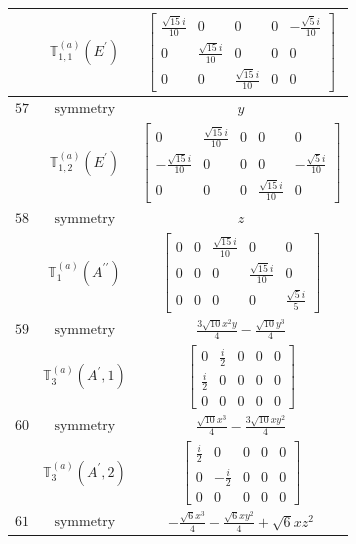 \documentclass[fleqn,8pt,landscape]{jsarticle}
\begin{document}
\begin{longtable}{ccc}
$  $ & $ \mathbb{T}_{1,1}^{(a)}(E^{\prime}) $ & $ \begin{bmatrix} \frac{\sqrt{15} i}{10} & 0 & 0 & 0 & - \frac{\sqrt{5} i}{10} \\ 0 & \frac{\sqrt{15} i}{10} & 0 & 0 & 0 \\ 0 & 0 & \frac{\sqrt{15} i}{10} & 0 & 0 \end{bmatrix} $ \\ \hline
$ 57 $ & $ \text{symmetry} $ & $ y $ \\
$  $ & $ \mathbb{T}_{1,2}^{(a)}(E^{\prime}) $ & $ \begin{bmatrix} 0 & \frac{\sqrt{15} i}{10} & 0 & 0 & 0 \\ - \frac{\sqrt{15} i}{10} & 0 & 0 & 0 & - \frac{\sqrt{5} i}{10} \\ 0 & 0 & 0 & \frac{\sqrt{15} i}{10} & 0 \end{bmatrix} $ \\ \hline
$ 58 $ & $ \text{symmetry} $ & $ z $ \\
$  $ & $ \mathbb{T}_{1}^{(a)}(A^{\prime\prime}) $ & $ \begin{bmatrix} 0 & 0 & \frac{\sqrt{15} i}{10} & 0 & 0 \\ 0 & 0 & 0 & \frac{\sqrt{15} i}{10} & 0 \\ 0 & 0 & 0 & 0 & \frac{\sqrt{5} i}{5} \end{bmatrix} $ \\ \hline
$ 59 $ & $ \text{symmetry} $ & $ \frac{3 \sqrt{10} x^{2} y}{4} - \frac{\sqrt{10} y^{3}}{4} $ \\
$  $ & $ \mathbb{T}_{3}^{(a)}(A^{\prime},1) $ & $ \begin{bmatrix} 0 & \frac{i}{2} & 0 & 0 & 0 \\ \frac{i}{2} & 0 & 0 & 0 & 0 \\ 0 & 0 & 0 & 0 & 0 \end{bmatrix} $ \\ \hline
$ 60 $ & $ \text{symmetry} $ & $ \frac{\sqrt{10} x^{3}}{4} - \frac{3 \sqrt{10} x y^{2}}{4} $ \\
$  $ & $ \mathbb{T}_{3}^{(a)}(A^{\prime},2) $ & $ \begin{bmatrix} \frac{i}{2} & 0 & 0 & 0 & 0 \\ 0 & - \frac{i}{2} & 0 & 0 & 0 \\ 0 & 0 & 0 & 0 & 0 \end{bmatrix} $ \\ \hline
$ 61 $ & $ \text{symmetry} $ & $ - \frac{\sqrt{6} x^{3}}{4} - \frac{\sqrt{6} x y^{2}}{4} + \sqrt{6} x z^{2} $ \\

\end{longtable}
\end{document}
